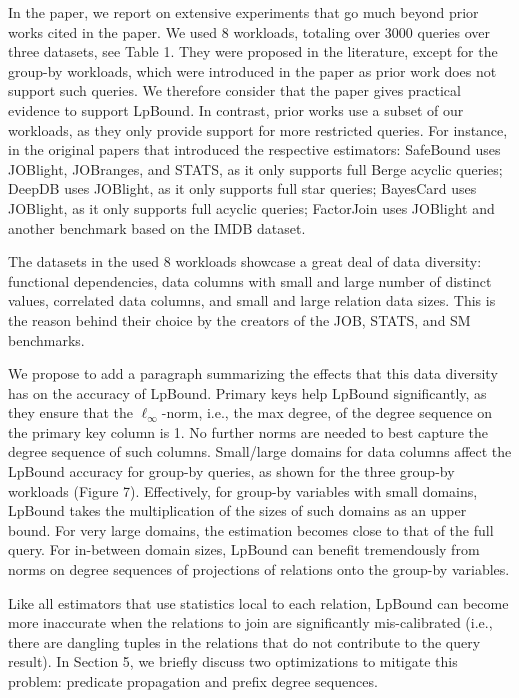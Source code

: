 {
\color{blue}
In the paper, we report on extensive experiments that go much beyond prior works cited in the paper. We used 8 workloads, totaling over 3000 queries over three datasets, see Table 1. They were proposed in the literature, except for the group-by workloads, which were introduced in the paper as prior work does not support such queries. We therefore consider that the paper gives practical evidence to support LpBound. In contrast, prior works use a subset of our workloads, as they only provide support for more restricted queries. For instance, in the original papers that introduced the respective estimators: SafeBound uses JOBlight, JOBranges, and STATS, as it only supports full Berge acyclic queries; DeepDB uses JOBlight, as it only supports full star queries; BayesCard uses JOBlight, as it only supports full acyclic queries; FactorJoin uses JOBlight and another benchmark based on the IMDB dataset.

The datasets in the used 8 workloads showcase a great deal of data diversity: functional dependencies, data columns with small and large number of distinct values, correlated data columns, and small and large relation data sizes. This is the reason behind their choice by the creators of the JOB, STATS, and SM benchmarks.

We propose to add a paragraph summarizing the effects that this data diversity has on the accuracy of LpBound. Primary keys help LpBound significantly, as they ensure that the $\ell_{\infty}$-norm, i.e., the max degree, of the degree sequence on the primary key column is 1. No further norms are needed to best capture the degree sequence of such columns. Small/large domains for data columns affect the LpBound accuracy for group-by queries, as shown for the three group-by workloads (Figure 7). Effectively, for group-by variables with small domains, LpBound  takes the multiplication of the sizes of such domains as an upper bound. For very large domains, the estimation becomes close to that of the full query. For in-between domain sizes, LpBound can benefit tremendously from norms on degree sequences of projections of relations onto the group-by variables. 


Like all estimators that use statistics local to each relation, LpBound can become more inaccurate when the relations to join are significantly mis-calibrated (i.e., there are dangling tuples in the relations that do not contribute to the query result). In Section 5, we briefly discuss two optimizations to mitigate this problem: predicate propagation and prefix degree sequences.
}


